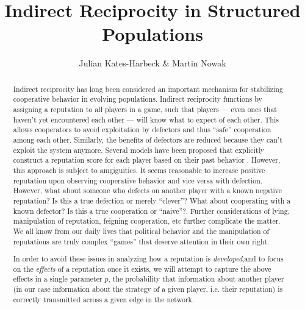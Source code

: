 \documentclass{article}
\title{Indirect Reciprocity in Structured Populations}
\author{Julian Kates-Harbeck \& Martin Nowak}
\renewcommand{\=}[1]{\stackrel{#1}{=}} %
\begin{document}
    
    
    \maketitle
    

    \begin{abstract}

Indirect reciprocity has long been considered \cite{nowak2006five} an important mechanism for stabilizing cooperative behavior in evolving populations. Indirect reciprocity functions by assigning a reputation to all players in a game, such that players --- even ones that haven't yet encountered each other --- will know what to expect of each other. This allows cooperators to avoid exploitation by defectors and thus ``safe'' cooperation among each other. Similarly, the benefits of defectors are reduced because they can't exploit the system anymore. Several models have been proposed that explicitly construct a reputation score for each player based on their past behavior \cite{nowak2005evolution}. However, this approach is subject to amgiguities. It seems reasonable to increase positive reputation upon observing cooperative behavior and vice versa with defection. However, what about someone who defects on another player with a known negative reputation? Is this a true defection or merely ``clever''? What about cooperating with a known defector? Is this a true cooperation or ``naive''?. Further considerations of lying, manipulation of reputation, feigning cooperation, etc further complicate the matter. We all know from our daily lives that political behavior and the manipulation of reputations are truly complex ``games'' that deserve attention in their own right.

In order to avoid these issues in analyzing how a reputation is \emph{developed},and to focus on the \emph{effects} of a reputation once it exists, we will attempt to capture the above effects in a single parameter $p$, the probability that information about another player (in our case information about the strategy of a given player, i.e. their reputation) is correctly transmitted across a given edge in the network.


\end{abstract}
\end{document}
